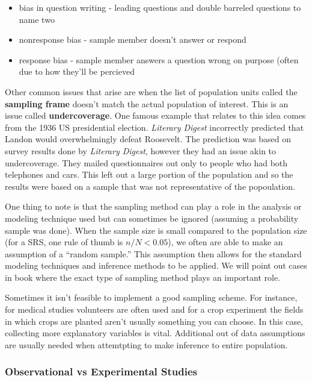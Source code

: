 \documentclass[
]{book}
\providecommand{\tightlist}{%
  \setlength{\itemsep}{0pt}\setlength{\parskip}{0pt}}
\theoremstyle{definition}
\theoremstyle{definition}
\theoremstyle{definition}
\theoremstyle{remark}
\begin{document}
\begin{itemize}
\tightlist
\item
  bias in question writing - leading questions and double barreled questions to name two\\
\item
  nonresponse bias - sample member doesn't answer or respond\\
\item
  response bias - sample member answers a question wrong on purpose (often due to how they'll be percieved
\end{itemize}

Other common issues that arise are when the list of population units called the \textbf{sampling frame} doesn't match the actual population of interest. This is an issue called \textbf{undercoverage}. One famous example that relates to this idea comes from the 1936 US presidential election. \emph{Literary Digest} incorrectly predicted that Landon would overwhelmingly defeat Roosevelt. The prediction was based on survey results done by \emph{Literary Digest}, however they had an issue akin to undercoverage. They mailed questionnaires out only to people who had both telephones and cars. This left out a large portion of the population and so the results were based on a sample that was not representative of the popoulation.

One thing to note is that the sampling method can play a role in the analysis or modeling technique used but can sometimes be ignored (assuming a probability sample was done). When the sample size is small compared to the population size (for a SRS, one rule of thumb is \(n/N < 0.05\)), we often are able to make an assumption of a ``random sample.'' This assumption then allows for the standard modeling techniques and inference methods to be applied. We will point out cases in book where the exact type of sampling method plays an important role.

Sometimes it isn't feasible to implement a good sampling scheme. For instance, for medical studies volunteers are often used and for a crop experiment the fields in which crops are planted aren't usually something you can choose. In this case, collecting more explanatory variables is vital. Additional out of data assumptions are usually needed when attemtpting to make inference to entire population.

\hypertarget{observational-vs-experimental-studies-1}{%
\subsubsection{Observational vs Experimental Studies}\label{observational-vs-experimental-studies-1}}
\end{document}
